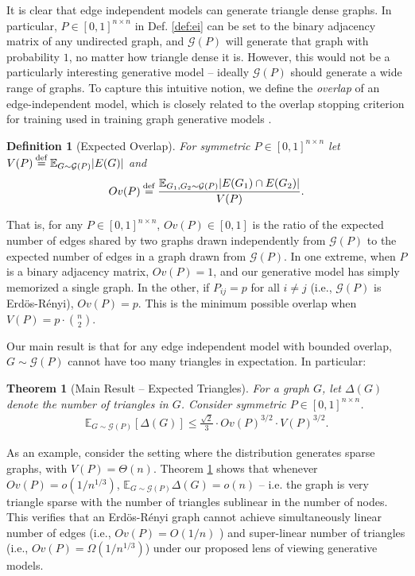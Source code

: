 \documentclass{article}
\newcommand{\eqdef}{\mathbin{\stackrel{\rm def}{=}}}
\newtheorem{theorem}{Theorem}
\newtheorem{definition}{Definition}
\newcommand{\E}{\mathbb{E}}
\begin{document}
It is clear that edge independent models can generate triangle dense graphs. In particular, $P \in [0,1]^{n \times n}$ in Def. \ref{def:ei} can be set to the binary adjacency matrix of any undirected graph, and $\mathcal{G}(P)$ will generate that graph with probability $1$, no matter how triangle dense it is. However, this would not be a particularly interesting generative model -- ideally $\mathcal{G}(P)$ should generate a wide range of graphs. To capture this intuitive notion, we define the \emph{overlap} of an edge-independent model, which is closely related to the overlap stopping criterion for training used in training graph generative models \cite{bojchevski2018netgan,rendsburgnetgan}.
\begin{definition}[Expected Overlap]\label{def:ov} For symmetric $P \in [0,1]^{n \times n}$ let $V(P) \eqdef \E_{G \sim \mathcal{G}(P)} |E(G)|$ and
\begin{align*}
Ov(P) \eqdef \frac{\E_{G_1,G_2 \sim \mathcal{G}(P)} |E(G_1) \cap E(G_2)|}{V(P)}.
\end{align*}
\end{definition}
That is, for any $P \in [0,1]^{n \times n}$, $Ov(P) \in [0,1]$ is the ratio of the expected number of edges shared by two graphs drawn independently from $\mathcal{G}(P)$ to the expected number of edges in a graph drawn from $\mathcal{G}(P)$. In one extreme, when $P$ is a binary adjacency matrix, $Ov(P) = 1$, and our generative model has simply memorized a single graph. In the other, if $P_{ij} = p$ for all $i \neq j$ (i.e., $\mathcal{G}(P)$ is Erd\"{o}s-R\'{e}nyi), $Ov(P) = p$. This is the minimum possible overlap when $V(P) = p \cdot {n \choose 2}$.

Our main result is that for any edge independent model with bounded overlap, $G \sim \mathcal{G}(P)$ cannot have too many triangles in expectation. In particular:
\begin{theorem}[Main Result -- Expected Triangles]\label{thm:tri} For a graph $G$, let $\Delta(G)$ denote the number of triangles in $G$. Consider symmetric $P \in [0,1]^{n \times n}$.
\begin{align*}
\E_{G \sim \mathcal{G}(P)} \left [\Delta(G) \right ]\le \frac{\sqrt{2}}{3} \cdot Ov(P)^{3/2} \cdot V(P)^{3/2}.
\end{align*}
\end{theorem}
As an example, consider the setting where the distribution generates sparse graphs, with $V(P) = \Theta(n)$. Theorem \ref{thm:tri} shows that whenever  $Ov(P) = o(1/n^{1/3})$, $\E_{G \sim \mathcal{G}(P)} \Delta(G) = o(n)$ -- i.e. the graph is very triangle sparse with the number of triangles sublinear in the number of nodes. %
This verifies that  an Erd\"{o}s-R\'{e}nyi graph cannot achieve simultaneously linear number of edges  (i.e., $Ov(P) = O(1/n)$ ) and super-linear number of triangles (i.e., $Ov(P) = \Omega(1/n^{1/3})$) under our proposed lens of viewing generative models. 
\end{document}
